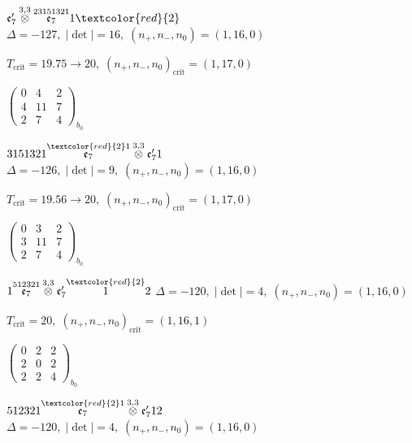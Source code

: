 \documentclass[10pt]{article}
\begin{document}
\smallskip

$\mathfrak{e}_7'\overset{3,3}{\otimes}\overset{23151321}{\mathfrak{e}_7}1\textcolor{red}{2}$ \quad $\Delta=-127,\; |\det|=16,\; (n_+,n_-,n_0)=(1,16,0)$

\hspace{1em}$T_{\text{crit}}=19.75 \to 20,\; (n_+,n_-,n_0)_{\text{crit}}=(1,17,0)$

\hspace{2em}$\left(\begin{smallmatrix}0 & 4 & 2 \\ 4 & 11 & 7 \\ 2 & 7 & 4\end{smallmatrix}\right)_{\!b_0}$

\smallskip

$3151321\overset{\textcolor{red}{2}1}{\mathfrak{e}_7}\overset{3,3}{\otimes}\mathfrak{e}_7'1$ \quad $\Delta=-126,\; |\det|=9,\; (n_+,n_-,n_0)=(1,16,0)$

\hspace{1em}$T_{\text{crit}}=19.56 \to 20,\; (n_+,n_-,n_0)_{\text{crit}}=(1,17,0)$

\hspace{2em}$\left(\begin{smallmatrix}0 & 3 & 2 \\ 3 & 11 & 7 \\ 2 & 7 & 4\end{smallmatrix}\right)_{\!b_0}$

\smallskip

$1\overset{512321}{\mathfrak{e}_7}\overset{3,3}{\otimes}\mathfrak{e}_7'\overset{\textcolor{red}{2}}{1}2$ \quad $\Delta=-120,\; |\det|=4,\; (n_+,n_-,n_0)=(1,16,0)$

\hspace{1em}$T_{\text{crit}}=20,\; (n_+,n_-,n_0)_{\text{crit}}=(1,16,1)$

\hspace{2em}$\left(\begin{smallmatrix}0 & 2 & 2 \\ 2 & 0 & 2 \\ 2 & 2 & 4\end{smallmatrix}\right)_{\!b_0}$

$512321\overset{\textcolor{red}{2}1}{\mathfrak{e}_7}\overset{3,3}{\otimes}\mathfrak{e}_7'12$ \quad $\Delta=-120,\; |\det|=4,\; (n_+,n_-,n_0)=(1,16,0)$
\end{document}
